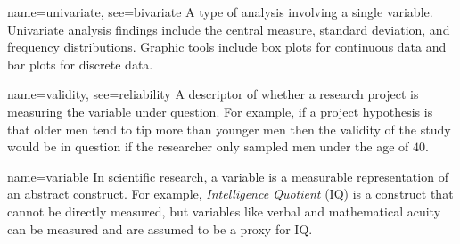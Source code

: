 {name={univariate},
	see={bivariate}}
{%
	A type of analysis involving a single variable. Univariate analysis findings include the central measure, standard deviation, and frequency distributions. Graphic tools include box plots for continuous data and bar plots for discrete data.
}

{name={validity},
 see={reliability}}
{%
	A descriptor of whether a research project is measuring the variable under question. For example, if a project hypothesis is that older men tend to tip more than younger men then the validity of the study would be in question if the researcher only sampled men under the age of $ 40 $.
}

{name={variable}}
{%
	In scientific research, a variable is a measurable representation of an abstract construct. For example, \textit{Intelligence Quotient} (IQ) is a construct that cannot be directly measured, but variables like verbal and mathematical acuity can be measured and are assumed to be a proxy for IQ.
}

